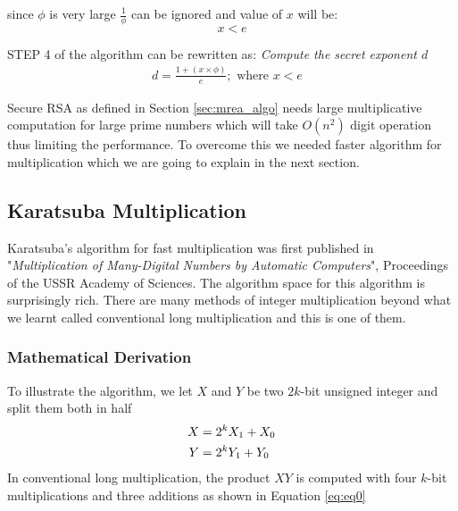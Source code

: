 \documentclass[12pt,journal,compsoc]{IEEEtran}
\begin{document}
since $\phi$ is very large $\frac{1}{\phi}$ can be ignored and value of $x$ will be:
\begin{equation}
	x < e
\end{equation}


STEP 4 of the algorithm can be rewritten as:
\emph{Compute the secret exponent $d$}
	\begin{align}
		d = \frac{1 + (x \times \phi)}{e}; \text{ where } x < e&
	\end{align}
	



Secure RSA as defined in Section \ref{sec:mrea_algo} needs large multiplicative computation for large prime numbers which will take $O(n^2)$ digit operation thus limiting the performance. To overcome this we needed faster algorithm for multiplication which we are going to explain in the next section.

\subsection{{Karatsuba Multiplication}}
\label{sec: karatsuba_code}
Karatsuba's algorithm for fast multiplication was first published in "\emph{Multiplication of Many-Digital Numbers by Automatic Computers}"\cite{karatsuba}, Proceedings of the USSR Academy of Sciences. The algorithm space for this algorithm is surprisingly rich. There are many methods of integer multiplication beyond what we learnt called conventional long multiplication and this is one of them. 

\subsubsection{\bf Mathematical Derivation}

To illustrate the algorithm, we let $X$ and $Y$ be two $2k$-bit unsigned integer and split them both in half
\begin{align}
X &= 2^{k}X_{1} + X_{0} \notag \\
Y &= 2^{k}Y_{1} + Y_{0} 
\end{align}
In conventional long multiplication, the product $XY$ is computed with four $k$-bit multiplications and three additions as shown in Equation \ref{eq:eq0}
\end{document}
